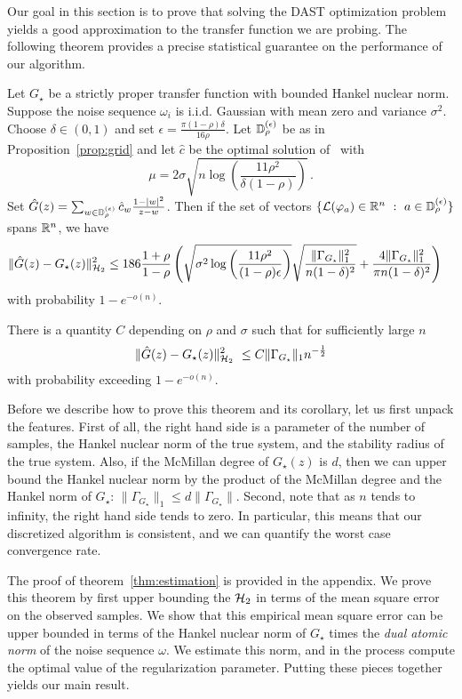 Our goal in this section is to prove that solving the DAST optimization problem yields a good approximation to the transfer function we are probing. The following theorem provides a precise statistical guarantee on the performance of our algorithm.
\begin{theorem}\label{thm:estimation}  Let $G_\star$ be a strictly proper transfer function with bounded Hankel nuclear norm. Suppose the noise sequence $\omega_i$ is i.i.d. Gaussian with mean zero and variance $\sigma^2$.  Choose $\delta \in (0,1)$ and set $\epsilon = \frac{\pi (1-\rho)\delta}{16 \rho}$.  Let $\mathbb{D}_\rho^{(\epsilon)}$ be as in Proposition~\ref{prop:grid} and let $\hat{c}$ be the optimal solution of~ with 
\[
\mu=2\sigma \sqrt{ n \log \left(\frac{11 \rho^2}{\delta(1-\rho)} \right)}\,.
\]
Set $\hat{G}(z) = \sum_{w \in \mathbb{D}_{\rho}^{(\epsilon)}} \hat{c}_w \frac{1-|w|^2}{z-w}$.  Then if the set of vectors $\{\mathcal{L}(\varphi_a)\in \mathbb{R}^n~:~a\in\mathbb{D}_{\rho}^{(\epsilon)}\}$ spans $\mathbb{R}^n$, we have 
\[
\begin{aligned}
	&\|\hat{G}(z)-G_{\star}(z)\|_{\mathcal{H}_2}^2 \leq  
	186 \frac{1+\rho}{1-\rho} \left( \sqrt{\sigma^2 \log\left(\frac{11 \rho^2}{(1-\rho)\epsilon}\right)}\sqrt{\frac{\|\Gamma_{G_\star}\|_{1}^2}{n(1-\delta)^2} } + \frac{4\|\Gamma_{G_\star}\|_{1}^2}{\pi n(1-\delta)^2}   \right)
	\end{aligned}
\]
with probability $1-e^{-o(n)}$.
\end{theorem}
\begin{corollary} \label{cor:1}
There is a quantity $C$ depending on $\rho$ and $\sigma$ such that for sufficiently large $n$
$$\|\hat{G}(z)-G_{\star}(z)\|_{\mathcal{H}_2}^2\ \leq C \| \Gamma_{G_{\star}} \|_1 n^{-\frac{1}{2}}$$
with probability exceeding $1-e^{-o(n)}$.
\end{corollary}
\noindent Before we describe how to prove this theorem and its corollary, let us first unpack the features.  First of all, the right hand side is a parameter of the number of samples, the Hankel nuclear norm of the true system, and the stability radius of the true system.  Also, if the McMillan degree of $G_\star(z)$ is $d$, then we can upper bound the Hankel nuclear norm by the product of the McMillan degree and the Hankel norm of $G_\star$: $\|\Gamma_{G_\star}\|_1 \leq d \|\Gamma_{G_\star}\|$.
Second, note that as $n$ tends to infinity, the right hand side tends to zero.  In particular, this means that our discretized algorithm is consistent, and we can quantify the worst case convergence rate.  

The proof of theorem~\ref{thm:estimation} is provided in the appendix.  We prove this theorem by first upper bounding the $\mathcal{H}_2$ in terms of the mean square error on the observed samples.  We show that this empirical mean square error can be upper bounded in terms of the Hankel nuclear norm of $G_\star$ times the \emph{dual atomic norm} of the noise sequence $\omega$.  We estimate this norm, and in the process compute the optimal value of the regularization parameter.  Putting these pieces together yields our main result.

